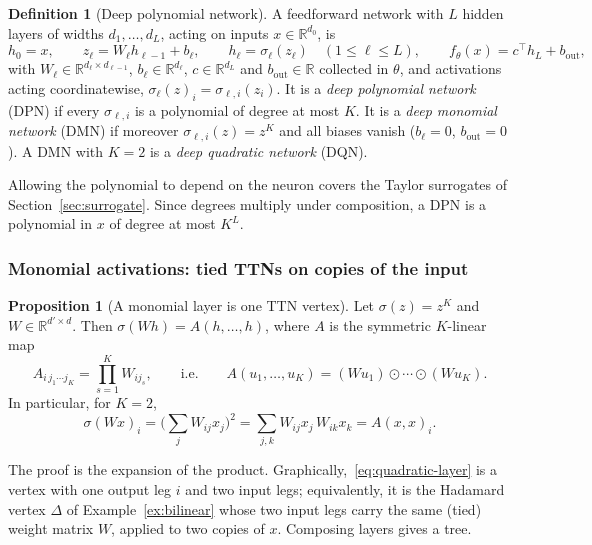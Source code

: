 \documentclass[11pt]{article}
\newcommand{\R}{\mathbb{R}}
\theoremstyle{definition}
\newtheorem{proposition}[theorem]{Proposition}
\newtheorem{definition}[theorem]{Definition}
\numberwithin{equation}{section}
\begin{document}
\begin{definition}[Deep polynomial network]\label{def:dpn}
A feedforward network with $L$ hidden layers of widths $d_1,\dots,d_L$, acting on inputs $x\in\R^{d_0}$, is
\begin{equation}\label{eq:network}
h_0=x,\qquad z_\ell=W_\ell h_{\ell-1}+b_\ell,\qquad h_\ell=\sigma_\ell(z_\ell)\quad(1\le\ell\le L),\qquad f_\theta(x)=c^\top h_L+b_{\mathrm{out}},
\end{equation}
with $W_\ell\in\R^{d_\ell\times d_{\ell-1}}$, $b_\ell\in\R^{d_\ell}$, $c\in\R^{d_L}$ and $b_{\mathrm{out}}\in\R$ collected in $\theta$, and activations acting coordinatewise, $\sigma_\ell(z)_i=\sigma_{\ell,i}(z_i)$. It is a \emph{deep polynomial network} (DPN) if every $\sigma_{\ell,i}$ is a polynomial of degree at most $K$. It is a \emph{deep monomial network} (DMN) if moreover $\sigma_{\ell,i}(z)=z^K$ and all biases vanish ($b_\ell=0$, $b_{\mathrm{out}}=0$). A DMN with $K=2$ is a \emph{deep quadratic network} (DQN).
\end{definition}

Allowing the polynomial to depend on the neuron covers the Taylor surrogates of Section~\ref{sec:surrogate}. Since degrees multiply under composition, a DPN is a polynomial in $x$ of degree at most $K^L$.

\subsubsection{Monomial activations: tied TTNs on copies of the input}

\begin{proposition}[A monomial layer is one TTN vertex]\label{prop:monomial-layer}
Let $\sigma(z)=z^K$ and $W\in\R^{d'\times d}$. Then $\sigma(Wh)=A(h,\dots,h)$, where $A$ is the symmetric $K$-linear map
\[
A_{i\,j_1\cdots j_K}=\prod_{s=1}^KW_{ij_s},\qquad\text{i.e.}\qquad A(u_1,\dots,u_K)=(Wu_1)\odot\cdots\odot(Wu_K).
\]
In particular, for $K=2$,
\begin{equation}\label{eq:quadratic-layer}
\sigma(Wx)_i=\Big(\sum_jW_{ij}x_j\Big)^2=\sum_{j,k}W_{ij}x_j\,W_{ik}x_k=A(x,x)_i .
\end{equation}
\end{proposition}

The proof is the expansion of the product. Graphically,~\eqref{eq:quadratic-layer} is a vertex with one output leg $i$ and two input legs; equivalently, it is the Hadamard vertex $\Delta$ of Example~\ref{ex:bilinear} whose two input legs carry the same (tied) weight matrix $W$, applied to two copies of $x$. Composing layers gives a tree.
\end{document}
